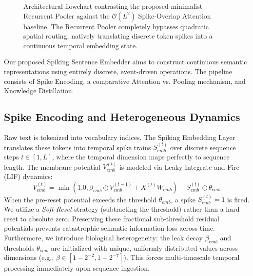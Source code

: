 \documentclass{article} %
\begin{document}
\begin{figure}[ht]
{%
}
\caption{Architectural flowchart contrasting the proposed minimalist Recurrent Pooler against the $\mathcal{O}(L^2)$ Spike-Overlap Attention baseline. The Recurrent Pooler completely bypasses quadratic spatial routing, natively translating discrete token spikes into a continuous temporal embedding state.}
\label{fig:architecture}
\end{figure}

Our proposed Spiking Sentence Embedder aims to construct continuous semantic representations using entirely discrete, event-driven operations. The pipeline consists of Spike Encoding, a comparative Attention vs. Pooling mechanism, and Knowledge Distillation.

\subsection{Spike Encoding and Heterogeneous Dynamics}
Raw text is tokenized into vocabulary indices. The Spiking Embedding Layer translates these tokens into temporal spike trains $S_{emb}^{(t)}$ over discrete sequence steps $t \in [1, L]$, where the temporal dimension maps perfectly to sequence length. The membrane potential $V_{emb}^{(t)}$ is modeled via Leaky Integrate-and-Fire (LIF) dynamics:
\begin{equation}
V_{emb}^{(t)} = \min\left(1.0, \beta_{emb} \odot V_{emb}^{(t-1)} + X^{(t)} W_{emb}\right) - S_{emb}^{(t)} \odot \theta_{emb}
\end{equation}
When the pre-reset potential exceeds the threshold $\theta_{emb}$, a spike $S_{emb}^{(t)} = 1$ is fired. We utilize a \textit{Soft-Reset} strategy (subtracting the threshold) rather than a hard reset to absolute zero. Preserving these fractional sub-threshold residual potentials prevents catastrophic semantic information loss across time. Furthermore, we introduce biological heterogeneity: the leak decay $\beta_{emb}$ and thresholds $\theta_{emb}$ are initialized with unique, uniformly distributed values across dimensions (e.g., $\beta \in [1 - 2^{-2}, 1 - 2^{-7}]$). This forces multi-timescale temporal processing immediately upon sequence ingestion. 
\end{document}

